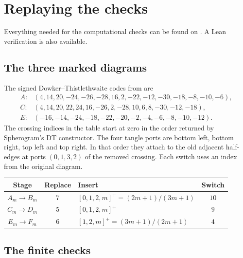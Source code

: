 \documentclass[a4paper,11pt]{amsart}
\numberwithin{equation}{subsection}
\theoremstyle{plain}
\theoremstyle{remark}
\begin{document}
\section{Replaying the checks}\label{sec:verification}

Everything needed for the computational
checks can be found on \cite{DKT2}. A Lean verification is also available.

\subsection{The three marked diagrams}

The signed Dowker--Thistlethwaite codes from \cite[Theorem~1.3]{BH-small} are
\begin{align*}
A\colon{}&(4,14,20,-24,-26,-28,16,2,-22,-12,-30,-18,-8,-10,-6),\\
C\colon{}&(4,14,20,22,24,16,-26,2,-28,10,6,8,-30,-12,-18),\\
E\colon{}&(-16,-14,-24,-18,-22,-20,-2,-4,-6,-8,-10,-12).
\end{align*}
The crossing indices in the table start at zero in the order returned by Spherogram's DT constructor. The four tangle ports are bottom left, bottom right, top left and top right. In that order they attach to the old adjacent half-edges at ports $(0,1,3,2)$ of the removed crossing. Each switch uses an index from the original diagram.
\begin{center}
\begin{tabular}{@{}c c l c@{}}
\toprule
Stage & Replace & Insert & Switch\\
\midrule
$A_m\to B_m$ & $7$ & $[0,1,2,m]^+=(2m+1)/(3m+1)$ & $10$\\
$C_m\to D_m$ & $5$ & $[0,1,2,m]^+$ & $9$\\
$E_m\to F_m$ & $6$ & $[1,2,m]^+=(3m+1)/(2m+1)$ & $4$\\
\bottomrule
\end{tabular}
\end{center}

\subsection{The finite checks}
\end{document}
